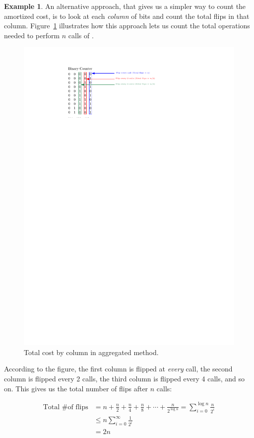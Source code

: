 \documentclass[11pt]{article}
\theoremstyle{definition}
\newtheorem{exmp}{Example}[section]
\begin{document}
\begin{exmp}
An alternative approach, that gives us a simpler way to count the amortized cost, is to look at each \emph{column} of bits and count the
total flips in that column.  Figure~\ref{fig:columns} illustrates how this approach lets us count the total operations needed to perform $n$ calls of .
\begin{figure}[tbh]
\centering
\includegraphics[scale=1]{figures/columns.pdf}
\caption{Total cost by column in aggregated method.}
\label{fig:columns}
\end{figure}

According to the figure, the first column is flipped at \emph{every} call, the second column is flipped every 2 calls, the third column is flipped every 4 calls, and so on.  This gives us the total number of flips after $n$ calls:

\begin{align*}
\text{Total \# of flips} & = n + \frac{n}{2} + \frac{n}{4} + \frac{n}{8} + \cdots + \frac{n}{2^{\log{n}}} = \sum_{i=0}^{\log{n}} \frac{n}{2^i} \\
& \leq n\sum_{i=0}^{\infty} \frac{1}{2^i} \\
& = 2n
\end{align*}


\end{exmp}
\end{document}
